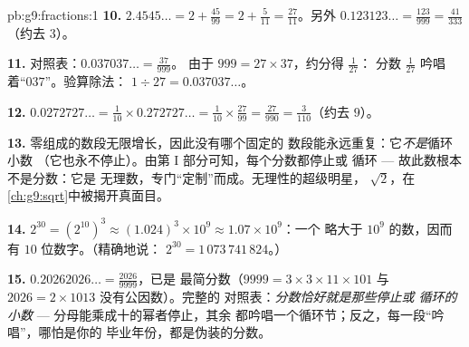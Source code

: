 \begin{solution}{pb:g9:fractions:1}
\textbf{10.} $2.4545\ldots = 2 + \frac{45}{99} = 2 +
\frac{5}{11} = \frac{27}{11}$。另外
$0.123123\ldots = \frac{123}{999} = \frac{41}{333}$（约去
$3$）。

\textbf{11.} 对照表：$0.037037\ldots = \frac{37}{999}$。
由于 $999 = 27 \times 37$，约分得 $\frac{1}{27}$：
分数 $\frac{1}{27}$ 吟唱着“$037$”。验算除法：
$1 \div 27 = 0.037037\ldots$。

\textbf{12.} $0.0272727\ldots = \frac{1}{10} \times
0.272727\ldots = \frac{1}{10} \times \frac{27}{99}
= \frac{27}{990} = \frac{3}{110}$（约去 $9$）。

\textbf{13.} 零组成的数段无限增长，因此没有哪个固定的
数段能永远重复：它\emph{不是}循环小数
（它也永不停止）。由第 I 部分可知，每个分数都停止或
循环 --- 故此数根本不是分数：它是
无理数，专门“定制”而成。无理性的超级明星，
$\sqrt2$，在\cref{ch:g9:sqrt}中被揭开真面目。

\textbf{14.} $2^{30} = \left(2^{10}\right)^3 \approx
(1.024)^3 \times 10^9 \approx 1.07 \times 10^9$：一个
略大于 $10^9$ 的数，因而有 $10$ 位数字。（精确地说：
$2^{30} = 1\,073\,741\,824$。）

\textbf{15.} $0.20262026\ldots = \frac{2026}{9999}$，已是
最简分数（$9999 = 3 \times 3 \times 11 \times 101$ 与
$2026 = 2 \times 1013$ 没有公因数）。完整的
对照表：\emph{分数恰好就是那些停止或
循环的小数} --- 分母能乘成十的幂者停止，其余
都吟唱一个循环节；反之，每一段“吟唱”，哪怕是你的
毕业年份，都是伪装的分数。
\end{solution}
